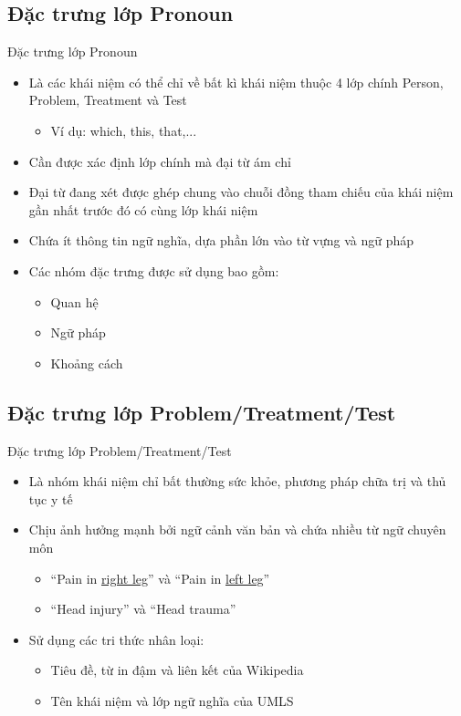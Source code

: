 \subsection{Đặc trưng lớp Pronoun}
\begin{frame}{Đặc trưng lớp Pronoun}
\putlogo
\begin{itemize}
	\item Là các khái niệm có thể chỉ về bất kì khái niệm thuộc 4 lớp chính Person, Problem, Treatment và Test
	\begin{itemize}
		\item Ví dụ: which, this, that,...
	\end{itemize}
	\item Cần được {\color{red} xác định lớp chính} mà đại từ ám chỉ
	\item Đại từ đang xét được ghép chung vào chuỗi đồng tham chiếu của khái niệm gần nhất trước đó có cùng lớp khái niệm
	\item Chứa ít thông tin ngữ nghĩa, dựa phần lớn vào từ vựng và ngữ pháp
	\item Các nhóm đặc trưng được sử dụng bao gồm:
	\begin{itemize}
		\item Quan hệ
		\item Ngữ pháp
		\item Khoảng cách
	\end{itemize}
\end{itemize}
\end{frame}

\subsection{Đặc trưng lớp Problem/Treatment/Test}
\begin{frame}{Đặc trưng lớp Problem/Treatment/Test}
\putlogo
\begin{itemize}
	\item Là nhóm khái niệm chỉ bất thường sức khỏe, phương pháp chữa trị và thủ tục y tế
	\item Chịu ảnh hưởng mạnh bởi {\color{red} ngữ cảnh văn bản} và chứa nhiều {\color{red} từ ngữ chuyên môn}
	\begin{itemize}
		\item ``Pain in \underline{right leg}'' và ``Pain in \underline{left leg}''
		\item ``Head injury'' và ``Head trauma''
	\end{itemize}
	\item Sử dụng các tri thức nhân loại:
	\begin{itemize}
		\item Tiêu đề, từ in đậm và liên kết của {\color{red} Wikipedia}
		\item Tên khái niệm và lớp ngữ nghĩa của {\color{red} UMLS}
	\end{itemize}
\end{itemize}
\end{frame}

